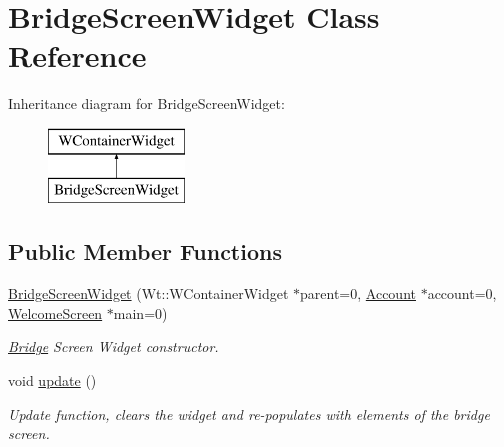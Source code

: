 \hypertarget{classBridgeScreenWidget}{}\section{Bridge\+Screen\+Widget Class Reference}
\label{classBridgeScreenWidget}
Inheritance diagram for Bridge\+Screen\+Widget\+:\begin{figure}[H]
\begin{center}
\leavevmode
\includegraphics[height=2.000000cm]{classBridgeScreenWidget}
\end{center}
\end{figure}
\subsection*{Public Member Functions}
\begin{DoxyCompactItemize}
\item 
\hyperlink{classBridgeScreenWidget_a17d86f1985d1ec0efa19a236d062f754}{Bridge\+Screen\+Widget} (Wt\+::\+W\+Container\+Widget $\ast$parent=0, \hyperlink{classAccount}{Account} $\ast$account=0, \hyperlink{classWelcomeScreen}{Welcome\+Screen} $\ast$main=0)
\begin{DoxyCompactList}\small\item\em \hyperlink{classBridge}{Bridge} Screen Widget constructor. \end{DoxyCompactList}\item 
void \hyperlink{classBridgeScreenWidget_ad04066096ae05d0c96045d3e13c1fd14}{update} ()
\begin{DoxyCompactList}\small\item\em Update function, clears the widget and re-\/populates with elements of the bridge screen. \end{DoxyCompactList}\end{DoxyCompactItemize}
